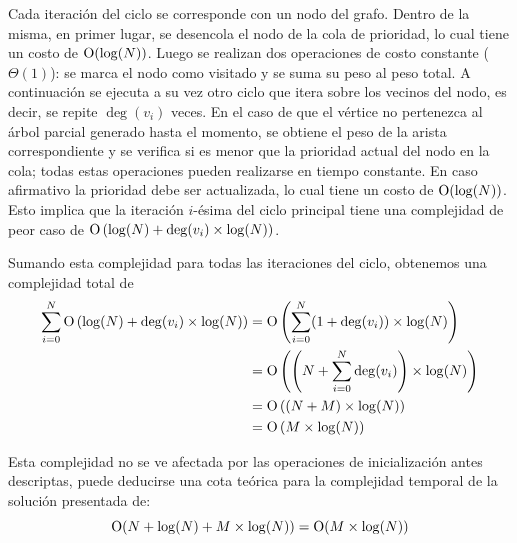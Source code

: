     Cada iteración del ciclo se corresponde con un nodo del grafo. Dentro de
    la misma, en primer lugar, se desencola el nodo de la cola de prioridad,
    lo cual tiene un costo de $\operatorname{O}(\log(N))$. Luego se realizan dos
    operaciones de costo constante ($\Theta(1)$): se marca el nodo como
    visitado y se suma su peso al peso total. A continuación se ejecuta a su
    vez otro ciclo que itera sobre los vecinos del nodo, es decir, se repite
    $\operatorname{deg}(v_i)$ veces. En el caso de que el vértice no
    pertenezca al árbol parcial generado hasta el momento, se obtiene
    el peso de la arista correspondiente y se verifica si es menor
    que la prioridad actual del nodo en la cola; todas estas operaciones
    pueden realizarse en tiempo constante. En caso afirmativo la prioridad
    debe ser actualizada, lo cual tiene un costo de $\operatorname{O}(\log(N))$. Esto
    implica que la iteración $i$-ésima del ciclo principal tiene una
    complejidad de peor caso de
    $\operatorname{O} \left(\log(N) + \operatorname{deg}(v_i) \times \log(N) \right)$.

    Sumando esta complejidad para todas las iteraciones del ciclo, obtenemos
    una complejidad total de
    \[ \begin{aligned}
    \sum_{i=0}^{N} \operatorname{O} \left( \log(N) + \operatorname{deg}(v_i)
        \times \log(N) \right)
            &= \operatorname{O} \left( \sum_{i=0}^{N} (1+\operatorname{deg}(v_i))
                \times \log(N) \right) \\
            &= \operatorname{O} \left( \left( N + \sum_{i=0}^{N}
                \operatorname{deg}(v_i) \right) \times \log(N) \right) \\
            &= \operatorname{O} \left( (N + M) \times \log(N) \right) \\
            &= \operatorname{O} \left( M \times \log(N) \right)
    \end{aligned} \]

    Esta complejidad no se ve afectada por las operaciones de inicialización
    antes descriptas, puede deducirse una cota teórica para
    la complejidad temporal de la solución presentada de:
    \[ \operatorname{O}(N + \log(N) + M \times \log(N)) = \operatorname{O}(M \times \log(N)) \]

